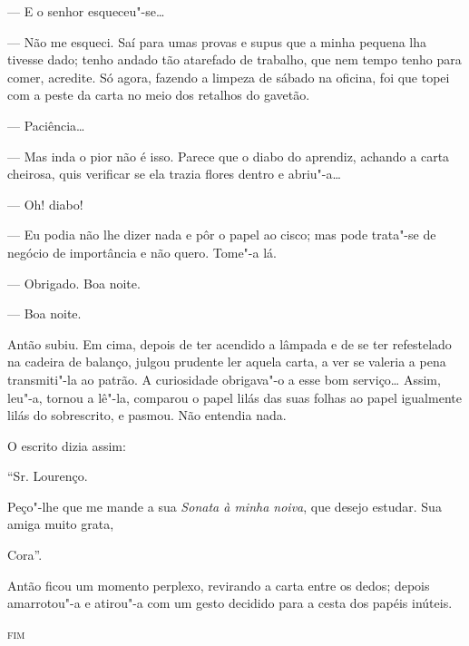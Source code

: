 --- E o senhor esqueceu"-se\ldots{}

--- Não me esqueci. Saí para umas provas e supus que a minha pequena lha
tivesse dado; tenho andado tão atarefado de trabalho, que nem tempo
tenho para comer, acredite. Só agora, fazendo a limpeza de sábado na
oficina, foi que topei com a peste da carta no meio dos retalhos do
gavetão.

--- Paciência\ldots{}

--- Mas inda o pior não é isso. Parece que o diabo do aprendiz, achando
a carta cheirosa, quis verificar se ela trazia flores dentro e
abriu"-a\ldots{}

--- Oh! diabo!

--- Eu podia não lhe dizer nada e pôr o papel ao cisco; mas pode
trata"-se de negócio de importância e não quero. Tome"-a lá.

--- Obrigado. Boa noite.

--- Boa noite.

Antão subiu. Em cima, depois de ter acendido a lâmpada e de se ter
refestelado na cadeira de balanço, julgou prudente ler aquela carta, a
ver se valeria a pena transmiti"-la ao patrão. A curiosidade obrigava"-o a
esse bom serviço\ldots{} Assim, leu"-a, tornou a lê"-la, comparou o papel lilás
das suas folhas ao papel igualmente lilás do sobrescrito, e pasmou. Não
entendia nada.

O escrito dizia assim:

``Sr. Lourenço.

Peço"-lhe que me mande a sua \emph{Sonata à minha noiva}, que desejo
estudar. Sua amiga muito grata,

Cora''.

Antão ficou um momento perplexo, revirando a carta entre os dedos;
depois amarrotou"-a e atirou"-a com um gesto decidido para a cesta dos
papéis inúteis.

\bigskip

\begin{center}
\textsc{fim}
\end{center}
